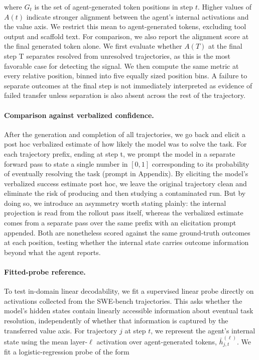 where $G_t$ is the set of agent-generated token positions in step $t$. Higher values of $A(t)$ indicate stronger alignment between the agent's internal activations and the value axis. We restrict this mean to agent-generated tokens, excluding tool output and scaffold text. For comparison, we also report the alignment score at the final generated token alone. We first evaluate whether $A(T)$ at the final step T separates resolved from unresolved trajectories, as this is the most favorable case for detecting the signal. We then compute the same metric at every relative position, binned into five equally sized position bins. A failure to separate outcomes at the final step is not immediately interpreted as evidence of failed transfer unless separation is also absent across the rest of the trajectory.

\paragraph{Comparison against verbalized confidence.} 


After the generation and completion of all trajectories, we go back and elicit a post hoc verbalized estimate of how likely the model was to solve the task. 
For each trajectory prefix, ending at step t, we prompt the model in a separate forward pass
to state a single number in $[0, 1]$ corresponding to its probability of eventually resolving the task (prompt in Appendix). By eliciting the model's verbalized success estimate post hoc, we leave the original trajectory clean and eliminate the risk of producing and then studying a contaminated run. But by doing so, we introduce an asymmetry worth stating plainly: the internal projection is read from the rollout pass itself, whereas the verbalized estimate comes from a separate pass over the same prefix with an elicitation prompt appended. Both are nonetheless scored against the same ground-truth outcomes at each position, testing whether the internal state carries outcome information beyond what the agent reports. 



\paragraph{Fitted-probe reference.} 

To test in-domain linear decodability, we fit a supervised linear probe directly on activations collected from the SWE-bench trajectories. This asks whether the model's hidden states contain linearly accessible information about eventual task resolution, independently of whether that information is captured by the transferred value axis. For trajectory $j$ at step $t$, we represent the agent's internal state using the mean layer-$\ell$ activation over agent-generated tokens, $\bar{h}_{j,t}^{(\ell)}$. We fit a logistic-regression probe of the form

